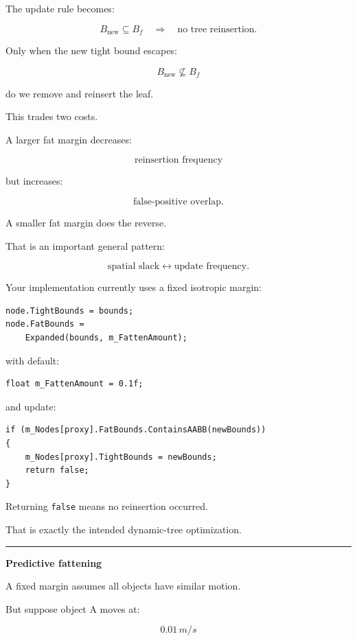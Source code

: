 The update rule becomes:

\[
B_{\text{new}}\subseteq B_f
\quad\Longrightarrow\quad
\text{no tree reinsertion}.
\]

Only when the new tight bound escapes:

\[
B_{\text{new}}\not\subseteq B_f
\]

do we remove and reinsert the leaf.

This trades two costs.

A larger fat margin decreases:

\[
\text{reinsertion frequency}
\]

but increases:

\[
\text{false-positive overlap}.
\]

A smaller fat margin does the reverse.

That is an important general pattern:

\[
\boxed{
\text{spatial slack}
\leftrightarrow
\text{update frequency}.
}
\]

Your implementation currently uses a fixed isotropic margin:

\begin{verbatim}
node.TightBounds = bounds;
node.FatBounds =
    Expanded(bounds, m_FattenAmount);
\end{verbatim}

with default:

\begin{verbatim}
float m_FattenAmount = 0.1f;
\end{verbatim}

and update:

\begin{verbatim}
if (m_Nodes[proxy].FatBounds.ContainsAABB(newBounds))
{
    m_Nodes[proxy].TightBounds = newBounds;
    return false;
}
\end{verbatim}

Returning \texttt{false} means no reinsertion occurred.

That is exactly the intended dynamic-tree optimization.

\begin{center}\rule{0.5\linewidth}{0.5pt}\end{center}

\textbf{Predictive fattening}

A fixed margin assumes all objects have similar motion.

But suppose object A moves at:

\[
0.01\,m/s
\]

